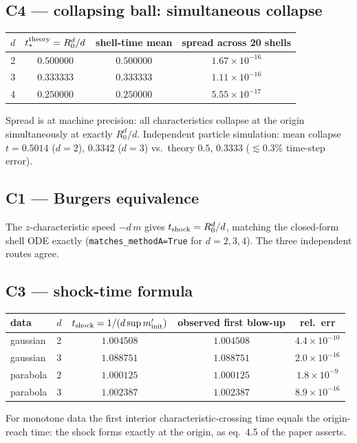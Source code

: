 \documentclass[11pt]{article}
\begin{document}
\subsection*{C4 --- collapsing ball: simultaneous collapse}
\begin{center}
\begin{tabular}{@{}cccc@{}}
\toprule
$d$ & $t_*^{\rm theory}=R_0^d/d$ & shell-time mean & spread across 20 shells \\ \midrule
2 & $0.500000$ & $0.500000$ & $1.67\!\times\!10^{-16}$ \\
3 & $0.333333$ & $0.333333$ & $1.11\!\times\!10^{-16}$ \\
4 & $0.250000$ & $0.250000$ & $5.55\!\times\!10^{-17}$ \\ \bottomrule
\end{tabular}
\end{center}
Spread is at machine precision: all characteristics collapse at the origin
simultaneously at exactly $R_0^d/d$. Independent particle simulation:
mean collapse $t=0.5014$ ($d\!=\!2$), $0.3342$ ($d\!=\!3$) vs.\ theory
$0.5$, $0.3333$ ($\lesssim 0.3\%$ time-step error).

\subsection*{C1 --- Burgers equivalence}
The $z$-characteristic speed $-d\,m$ gives $t_{\rm shock}=R_0^d/d$, matching
the closed-form shell ODE exactly (\texttt{matches\_methodA=True} for
$d=2,3,4$). The three independent routes agree.

\subsection*{C3 --- shock-time formula}
\begin{center}
\begin{tabular}{@{}llccc@{}}
\toprule
data & $d$ & $t_{\rm shock}=1/(d\sup m'_{\rm init})$ & observed first blow-up & rel.\ err \\ \midrule
gaussian & 2 & $1.004508$ & $1.004508$ & $4.4\!\times\!10^{-10}$ \\
gaussian & 3 & $1.088751$ & $1.088751$ & $2.0\!\times\!10^{-16}$ \\
parabola & 2 & $1.000125$ & $1.000125$ & $1.8\!\times\!10^{-9}$ \\
parabola & 3 & $1.002387$ & $1.002387$ & $8.9\!\times\!10^{-16}$ \\ \bottomrule
\end{tabular}
\end{center}
For monotone data the first interior characteristic-crossing time equals the
origin-reach time: the shock forms exactly at the origin, as
eq.~4.5 of the paper asserts.
\end{document}
